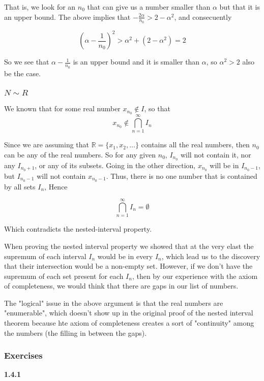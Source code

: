 That is, we look for an $n_0$ that can give us a number smaller than $\alpha$ but that it is an upper bound.
The above implies that $- \frac{2\alpha}{n_0} > 2 - \alpha^2$, and consecuently

$$
\left( \alpha - \frac{1}{n_0} \right)^2 >
    \alpha^2 + (2 - \alpha^2) = 2
$$

So we see that $\alpha - \frac{1}{n_0}$ is an upper bound and it is smaller than $\alpha$,
so $\alpha^2 > 2$ also be the case.


\subsubsection{$N \sim R$}

We known that for some real number $x_{n_0} \notin I$, so that
$$
x_{n_0} \notin \bigcap^{\infty}_{n=1} I_n
$$

Since we are assuming that $\mathbb{R} = \{ x_1, x_2, ... \}$ contains all the real numbers,
then $n_0$ can be any of the real numbers.
So for any given $n_0$, $I_{n_0}$ will not contain it, nor any $I_{n_0+1}$, or any of its subsets.
Going in the other direction, $x_{n_0}$ will be in $I_{n_0 - 1}$, but
$I_{n_0 - 1}$ will not contain $x_{n_0-1}$.
Thus, there is no one number that is contained by all sets $I_n$, Hence

$$
\bigcap^{\infty}_{n=1} I_n = \emptyset
$$

Which contradicts the nested-interval property.

When proving the nested interval property we showed that at the very elast the supremum of each interval $I_n$
would be in every $I_n$, which lead us to the discovery that their intersection would be a non-empty set.
However, if we don't have the supremum of each set present for each $I_n$, then by our experience with the axiom
of completeness, we would think that there are gaps in our list of numbers.

The "logical" issue in the above argument is that the real numbers are "enumerable", which doesn't show up in the original
proof of the nested interval theorem because hte axiom of completeness creates a sort of "continuity" among the numbers
(the filling in between the gaps).


\subsubsection{Exercises}

\textbf{1.4.1}

